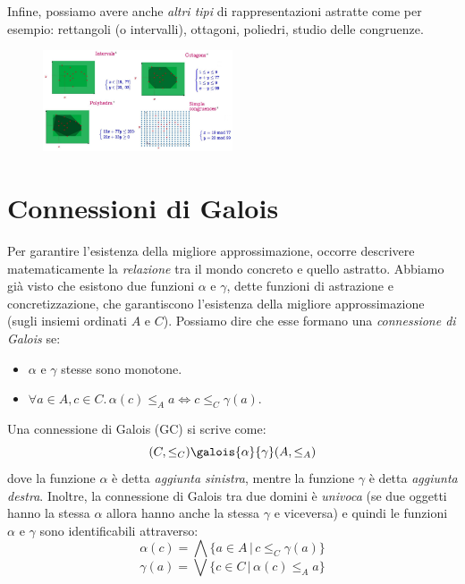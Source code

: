 \documentclass[a4paper,oneside,titlepage]{book}
\begin{document}
\noindent
Infine, possiamo avere anche \textit{altri tipi} di rappresentazioni astratte come per esempio: rettangoli (o intervalli), ottagoni, poliedri, studio delle congruenze.
\begin{figure}[htp]
	\centering
	\includegraphics[width=0.5\textwidth]{sign3.png}
\end{figure}


\section{Connessioni di Galois} %
Per garantire l'esistenza della migliore approssimazione, occorre descrivere matematicamente la \textit{relazione} tra il mondo concreto e quello astratto. Abbiamo già visto che esistono due funzioni $\alpha$ e $\gamma$, dette funzioni di astrazione e concretizzazione, che garantiscono l'esistenza della migliore approssimazione (sugli insiemi ordinati $A$ e $C$). Possiamo dire che esse formano una \textit{connessione di Galois} se:
\begin{itemize}
    \item $\alpha$ e $\gamma$ stesse sono monotone.
    \item $\forall a \in A , c \in C. \, \alpha(c) \leq_A a \iff c \leq_C \gamma(a)$.
\end{itemize}
Una connessione di Galois (GC) si scrive come:
\[
    (C, \leq_C) \galois{\alpha}{\gamma} (A, \leq_A)
\]
dove la funzione $\alpha$ è detta \textit{aggiunta sinistra}, mentre la funzione $\gamma$ è detta \textit{aggiunta destra}. Inoltre, la connessione di Galois tra due domini è \textit{univoca} (se due oggetti hanno la stessa $\alpha$ allora hanno anche la stessa $\gamma$ e viceversa) e quindi le funzioni $\alpha$ e $\gamma$ sono identificabili attraverso:
\[
    \alpha(c) = \bigwedge \{ a \in A \, | \, c \leq_C \gamma(a) \}
\]
\[
    \gamma(a) = \bigvee \{ c \in C \, | \, \alpha(c) \leq_A a \}
\]
\end{document}
